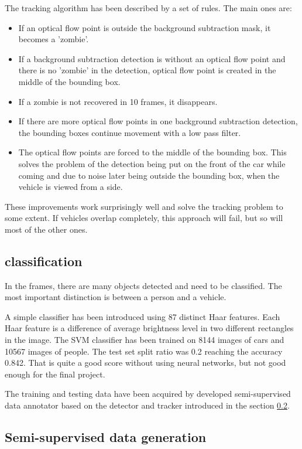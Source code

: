 \documentclass[a4paper,12pt,titlepage, twoside]{article}
\numberwithin{figure}{section}
\begin{document}
The tracking algorithm has been described by a set of rules. The main ones are:
\begin{itemize}
	\item If an optical flow point is outside the background subtraction mask, it becomes a 'zombie'.
	\item If a background subtraction detection is without an optical flow point and there is no 'zombie' in the detection, optical flow point is created in the middle of the bounding box. 
	\item If a zombie is not recovered in 10 frames, it disappears. 
	\item If there are more optical flow points in one background subtraction detection, the bounding boxes continue movement with a low pass filter.
	\item The optical flow points are forced to the middle of the bounding box. This solves the problem of the detection being put on the front of the car while coming and due to noise later being outside the bounding box, when the vehicle is viewed from a side. 
\end{itemize}

These improvements work surprisingly well and solve the tracking problem to some extent. If vehicles overlap completely, this approach will fail, but so will most of the other ones. 

\subsection{classification}

In the frames, there are many objects detected and need to be classified. The most important distinction is between a person and a vehicle. 

A simple classifier has been introduced using 87 distinct Haar features.  Each Haar feature is a difference of average brightness level in two different rectangles in the image. The SVM classifier has been trained on 8144 images of cars and 10567 images of people. The test set split ratio was 0.2 reaching the accuracy 0.842. That is quite a good score without using neural networks, but not good enough for the final project.

The training and testing data have been acquired by developed semi-supervised data annotator based on the detector and tracker introduced in the section \ref{sec:data-generation}.

\subsection{Semi-supervised data generation} 
\label{sec:data-generation}
\end{document}
